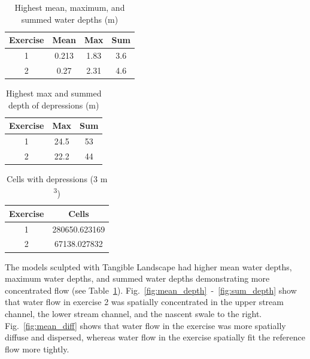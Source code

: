 \documentclass{isprs}
\begin{document}
\begin{table}[h!]
\caption{Highest mean, maximum, and summed water depths (m)}
\vspace*{0.5em}
\centering
\begin{tabular}{c | c c c}
Exercise & Mean & Max & Sum\\
\hline
1 & 0.213 & 1.83 & 3.6\\
2 & 0.27 & 2.31 & 4.6\\ 
\end{tabular}
\label{table:water_depth} 
\end{table}

\begin{table}[h!]
\caption{Highest max and summed depth of depressions (m)}
\vspace*{0.5em}
\centering
\begin{tabular}{c | c c}
Exercise & Max & Sum \\
\hline
1 & 24.5 & 53\\
2 & 22.2 & 44\\ 
\end{tabular}
\label{table:depressions} 
\end{table}

\begin{table}[h!]
\caption{Cells with depressions (3 m \textsuperscript{3})} 
\vspace*{0.5em}
\centering
\begin{tabular}{c | c}
Exercise & Cells\\
\hline
1 & 280650.623169\\
2 & 67138.027832\\ 
\end{tabular}
\label{table:cells} 
\end{table}

The models sculpted with Tangible Landscape had higher 
mean water depths, 
maximum water depths, and 
summed water depths
demonstrating more concentrated flow
(see Table~\ref{table:water_depth}).
%
Fig.~\ref{fig:mean_depth}~-~\ref{fig:sum_depth} 
show that water flow in exercise 2 was
spatially concentrated 
in the upper stream channel, 
the lower stream channel, 
and the nascent swale to the right.
%
%
Fig.~\ref{fig:mean_diff} 
shows that water flow in the  exercise was more spatially diffuse and dispersed, 
whereas water flow in the  exercise spatially fit the reference flow more tightly.
\end{document}
